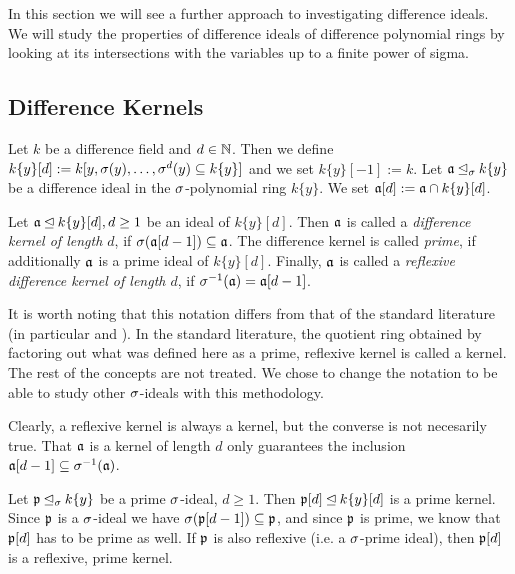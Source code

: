 In this section we will see a further approach to investigating difference ideals. We will study the properties of difference ideals of difference polynomial rings by looking at its intersections with the variables up to a finite power of sigma.

\subsection{Difference Kernels}


\begin{defn}
Let $k$ be a difference field and $d \in \mathbb{N}$. Then we define $k\{y\}[d]:= k[y,\sigma(y),\ldots,\sigma^d(y) \subseteq k\{y\}]$ and we set $k\{y\}[-1] := k$. Let $\mathfrak{a} \unlhd_{\sigma} k\{y\}$ be a difference ideal in the $\sigma$-polynomial ring $k\{y\}$. 
We set $\mathfrak{a}[d] := \mathfrak{a} \cap k\{y\}[d]$.
\end{defn}


\begin{defn}
Let $\mathfrak{a} \unlhd k\{y\}[d], d \geq 1$ be an ideal of $k\{y\}[d]$. Then $\mathfrak{a}$ is called a \emph{difference kernel of length $d$}, if $\sigma(\mathfrak{a}[d-1]) \subseteq \mathfrak{a}$. The difference kernel is called \emph{prime}, if additionally $\mathfrak{a}$ is a prime ideal of $k\{y\}[d]$.
Finally, $\mathfrak{a}$ is called a \emph{reflexive difference kernel of length $d$}, if $\sigma^{-1}(\mathfrak{a}) = \mathfrak{a}[d-1]$.   
\end{defn}

It is worth noting that this notation differs from that of the standard literature (in particular \cite{cohn} and \cite{levin}). In the standard literature, the quotient ring obtained by factoring out 
what was defined here as a prime, reflexive kernel is called a kernel. The rest of the concepts are not treated. We chose to change the notation to be able to study other $\sigma$-ideals with this methodology.

\begin{rem}
Clearly, a reflexive kernel is always a kernel, but the converse is not necesarily true. That $\mathfrak{a}$ is a kernel of length $d$ only guarantees the inclusion $\mathfrak{a}[d-1] \subseteq \sigma^{-1}(\mathfrak{a})$.
\end{rem}

\begin{ex}
Let $\mathfrak{p} \unlhd_{\sigma} k\{y\}$ be a prime $\sigma$-ideal, $d \geq 1$. Then $\mathfrak{p}[d] \unlhd k\{y\}[d]$ is a prime kernel. Since $\mathfrak{p}$ is a $\sigma$-ideal we have $\sigma(\mathfrak{p}[d-1]) \subseteq \mathfrak{p}$, 
and since $\mathfrak{p}$ is prime, we know that $\mathfrak{p}[d]$ has to be prime as well. If $\mathfrak{p}$ is also reflexive (i.e. a $\sigma$-prime ideal), then $\mathfrak{p}[d]$ is a reflexive, prime kernel. 
\end{ex}

